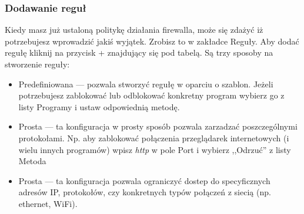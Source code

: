 \subsubsection{Dodawanie reguł}
Kiedy masz już ustaloną politykę działania firewalla, może się zdażyć iż potrzebujesz wprowadzić jakiś wyjątek. Zrobisz to w zakładce \textcolor{ubuntu_orange}{Reguły}. Aby dodać regułę kliknij na przycisk + znajdujący się pod tabelą. Są trzy sposoby na stworzenie reguły:
\begin{itemize}
\item \textcolor{ubuntu_orange}{Predefiniowana} --- pozwala stworzyć regułę w oparciu o szablon. Jeżeli potrzebujesz zablokować lub odblokować konkretny program wybierz go z listy \textcolor{ubuntu_orange}{Programy} i ustaw odpowiednią metodę.
\item \textcolor{ubuntu_orange}{Prosta} --- ta konfiguracja w prosty sposób pozwala zarzadzać poszczególnymi protokołami. Np. aby zablokować połączenia przeglądarek internetowych (i wielu innych programów) wpisz \textit{http} w pole \textcolor{ubuntu_orange}{Port} i wybierz ,,Odrzuć'' z listy \textcolor{ubuntu_orange}{Metoda}
\item \textcolor{ubuntu_orange}{Prosta} --- ta konfiguracja pozwala ograniczyć dostep do specyficznych adresów IP, protokołów, czy konkretnych typów połączeń z siecią (np. ethernet, WiFi).
\end{itemize}
